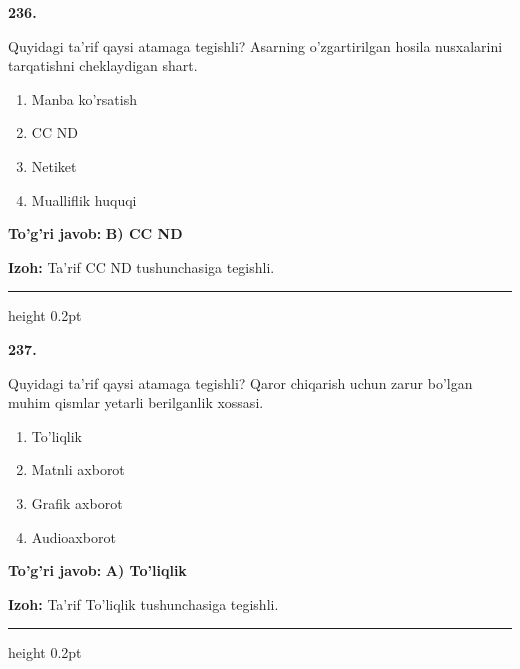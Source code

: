 \documentclass[10pt,a4paper,oneside]{article}
\begin{document}
\noindent\textbf{\color{ink}236.}
\par
Quyidagi ta'rif qaysi atamaga tegishli? Asarning o'zgartirilgan hosila nusxalarini tarqatishni cheklaydigan shart.
\begin{enumerate}[label=\Alph*),leftmargin=9mm]
\item Manba ko'rsatish
\item CC ND
\item Netiket
\item Mualliflik huquqi
\end{enumerate}
\begin{tcolorbox}[enhanced,breakable,colback=teal!4,colframe=teal!50!black,boxrule=0.5pt,arc=1.1mm,left=3mm,right=3mm,top=1.7mm,bottom=1.7mm,before skip=2mm,after skip=2mm]
\textbf{\color{teal}To'g'ri javob:} \textbf{B) CC ND}
\par\smallskip
\textbf{Izoh:} Ta'rif CC ND tushunchasiga tegishli.
\end{tcolorbox}
\vspace{2mm}\hrule height 0.2pt \vspace{3mm}

\noindent\textbf{\color{ink}237.}
\par
Quyidagi ta'rif qaysi atamaga tegishli? Qaror chiqarish uchun zarur bo'lgan muhim qismlar yetarli berilganlik xossasi.
\begin{enumerate}[label=\Alph*),leftmargin=9mm]
\item To'liqlik
\item Matnli axborot
\item Grafik axborot
\item Audioaxborot
\end{enumerate}
\begin{tcolorbox}[enhanced,breakable,colback=teal!4,colframe=teal!50!black,boxrule=0.5pt,arc=1.1mm,left=3mm,right=3mm,top=1.7mm,bottom=1.7mm,before skip=2mm,after skip=2mm]
\textbf{\color{teal}To'g'ri javob:} \textbf{A) To'liqlik}
\par\smallskip
\textbf{Izoh:} Ta'rif To'liqlik tushunchasiga tegishli.
\end{tcolorbox}
\vspace{2mm}\hrule height 0.2pt \vspace{3mm}
\end{document}
